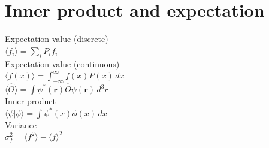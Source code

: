 \documentclass[12pt,a4paper]{article}
\begin{document}
	
	\section*{Inner product and expectation}
	\begin{center}
		Expectation value (discrete) \\[.15in]
		\(\langle f_i \rangle = \sum_{i} P_i f_i\) \\[.25in]
		Expectation value (continuous) \\[.15in]
		\(\langle f(x) \rangle = \int_{-\infty}^{\infty} f(x) P(x) \, dx\) \\[.15in]
		\(\langle \hat{O} \rangle = \int \psi^*(\mathbf{r}) \hat{O} \psi(\mathbf{r}) \, d^3r\) \\[.25in]
		Inner product \\[.15in]
		\(\langle \psi | \phi \rangle = \int \psi^*(x) \phi(x) \, dx\) \\[.25in]
		Variance \\[.15in]
		\(\sigma_f^2 = \langle f^2 \rangle - \langle f \rangle^2\)
	\end{center}	
	
	
	
\end{document}
